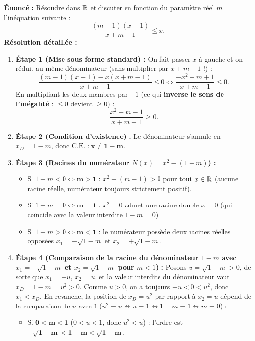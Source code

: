 \begin{exemple}
\textbf{Énoncé :} Résoudre dans $\mathbb{R}$ et discuter en fonction du paramètre réel $m$ l'inéquation suivante :
\[
    \frac{(m - 1)(x - 1)}{x + m - 1} \le x.
\]
\textbf{Résolution détaillée :}
\begin{enumerate}
    \item \textbf{Étape 1 (Mise sous forme standard) :} On fait passer $x$ à gauche et on réduit au même dénominateur (sans multiplier par $x + m - 1$ !) :
    \[
        \frac{(m - 1)(x - 1) - x(x + m - 1)}{x + m - 1} \le 0 \iff \frac{-x^2 - m + 1}{x + m - 1} \le 0.
    \]
    En multipliant les deux membres par $-1$ (ce qui \textbf{inverse le sens de l'inégalité} : $\le 0$ devient $\ge 0$) :
    \[
        \boxed{\frac{x^2 + m - 1}{x + m - 1} \ge 0}.
    \]
    \item \textbf{Étape 2 (Condition d'existence) :} Le dénominateur s'annule en $x_D = 1 - m$, donc $\text{C.E. } : \mathbf{x \neq 1 - m}$.
    \item \textbf{Étape 3 (Racines du numérateur $N(x) = x^2 - (1 - m)$) :}
    \begin{itemize}
        \item Si $1 - m < 0 \iff \mathbf{m > 1}$ : $x^2 + (m - 1) > 0$ pour tout $x \in \mathbb{R}$ (aucune racine réelle, numérateur toujours strictement positif).
        \item Si $1 - m = 0 \iff \mathbf{m = 1}$ : $x^2 = 0$ admet une racine double $x = 0$ (qui coïncide avec la valeur interdite $1 - m = 0$).
        \item Si $1 - m > 0 \iff \mathbf{m < 1}$ : le numérateur possède deux racines réelles opposées $x_1 = -\sqrt{1 - m}$ et $x_2 = +\sqrt{1 - m}$.
    \end{itemize}
    \item \textbf{Étape 4 (Comparaison de la racine du dénominateur $1 - m$ avec $x_1 = -\sqrt{1-m}$ et $x_2 = \sqrt{1-m}$ pour $m < 1$) :}
    Posons $u = \sqrt{1 - m} > 0$, de sorte que $x_1 = -u$, $x_2 = u$, et la valeur interdite du dénominateur vaut $x_D = 1 - m = u^2 > 0$.
    Comme $u > 0$, on a toujours $-u < 0 < u^2$, donc $x_1 < x_D$. En revanche, la position de $x_D = u^2$ par rapport à $x_2 = u$ dépend de la comparaison de $u$ avec $1$ ($u^2 = u \iff u = 1 \iff 1 - m = 1 \iff m = 0$) :
    \begin{itemize}
        \item Si $\mathbf{0 < m < 1}$ ($0 < u < 1$, donc $u^2 < u$) : l'ordre est $\mathbf{-\sqrt{1 - m} < 1 - m < \sqrt{1 - m}}$.

\end{itemize}
\end{enumerate}
\end{exemple}
